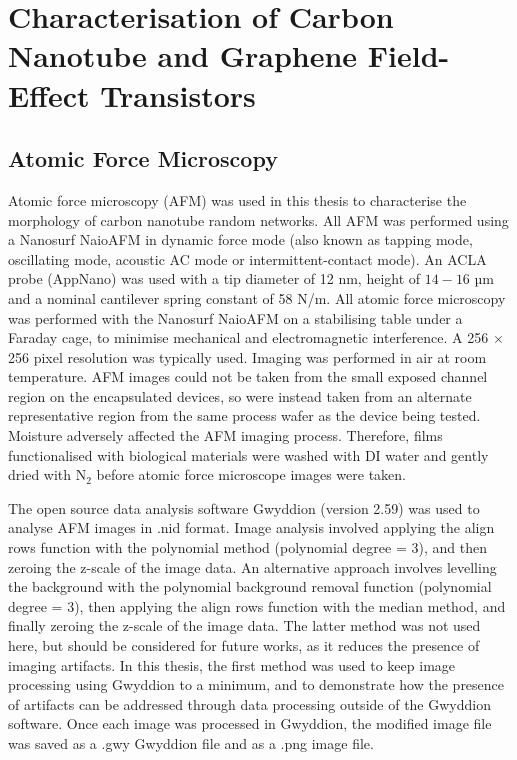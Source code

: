 \documentclass[
  a4paper,
]{scrbook}
\begin{document}
\hypertarget{characterisation-of-carbon-nanotube-and-graphene-field-effect-transistors}{%
\section{Characterisation of Carbon Nanotube and Graphene Field-Effect
Transistors}\label{characterisation-of-carbon-nanotube-and-graphene-field-effect-transistors}}

\hypertarget{sec-afm-characterisation}{%
\subsection{Atomic Force Microscopy}\label{sec-afm-characterisation}}

Atomic force microscopy (AFM) was used in this thesis to characterise
the morphology of carbon nanotube random networks. All AFM was performed
using a Nanosurf NaioAFM in dynamic force mode (also known as tapping
mode, oscillating mode, acoustic AC mode or intermittent-contact mode).
An ACLA probe (AppNano) was used with a tip diameter of 12 nm, height of
\(14-16\) µm and a nominal cantilever spring constant of 58 N/m. All
atomic force microscopy was performed with the Nanosurf NaioAFM on a
stabilising table under a Faraday cage, to minimise mechanical and
electromagnetic interference. A 256 \(\times\) 256 pixel resolution was
typically used. Imaging was performed in air at room temperature. AFM
images could not be taken from the small exposed channel region on the
encapsulated devices, so were instead taken from an alternate
representative region from the same process wafer as the device being
tested. Moisture adversely affected the AFM imaging process. Therefore,
films functionalised with biological materials were washed with DI water
and gently dried with N\(_2\) before atomic force microscope images were
taken.

The open source data analysis software Gwyddion (version 2.59) was used
to analyse AFM images in .nid format. Image analysis involved applying
the align rows function with the polynomial method (polynomial degree =
3), and then zeroing the z-scale of the image data. An alternative
approach involves levelling the background with the polynomial
background removal function (polynomial degree = 3), then applying the
align rows function with the median method, and finally zeroing the
z-scale of the image data. The latter method was not used here, but
should be considered for future works, as it reduces the presence of
imaging artifacts. In this thesis, the first method was used to keep
image processing using Gwyddion to a minimum, and to demonstrate how the
presence of artifacts can be addressed through data processing outside
of the Gwyddion software. Once each image was processed in Gwyddion, the
modified image file was saved as a .gwy Gwyddion file and as a .png
image file.
\end{document}
